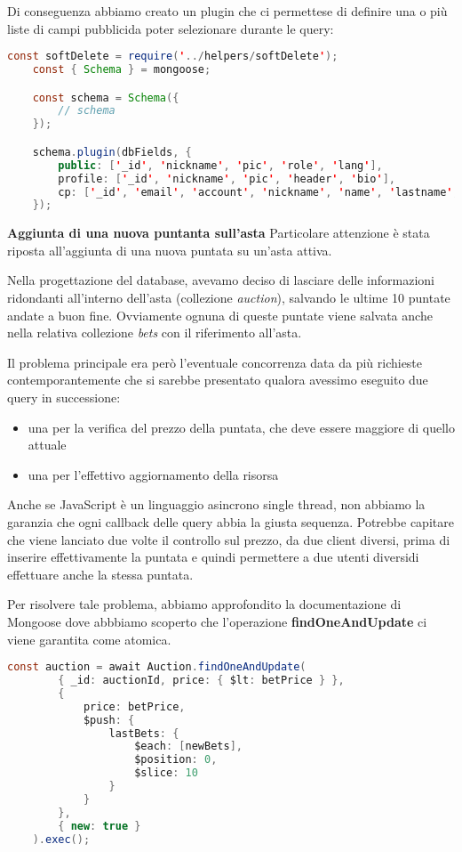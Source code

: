 Di conseguenza abbiamo creato un plugin che ci permettese di definire una o più liste di campi pubblicida poter selezionare durante le query:

\begin{lstlisting}[language=java]
	const softDelete = require('../helpers/softDelete');
	const { Schema } = mongoose;

	const schema = Schema({
		// schema
	});

	schema.plugin(dbFields, {
		public: ['_id', 'nickname', 'pic', 'role', 'lang'],
		profile: ['_id', 'nickname', 'pic', 'header', 'bio'],
		cp: ['_id', 'email', 'account', 'nickname', 'name', 'lastname', 'pic', 'lang', 'role', 'active']
	});
\end{lstlisting}

\bigbreak
\noindent
\textbf{Aggiunta di una nuova puntanta sull'asta}
\bigbreak
\noindent
Particolare attenzione è stata riposta all'aggiunta di una nuova puntata su un'asta attiva.

Nella progettazione del database, avevamo deciso di lasciare delle informazioni ridondanti all'interno dell'asta (collezione \textit{auction}),
salvando le ultime 10 puntate andate a buon fine. 
Ovviamente ognuna di queste puntate viene salvata anche nella relativa collezione \textit{bets} con il riferimento all'asta.

Il problema principale era però l'eventuale concorrenza data da più richieste contemporantemente
che si sarebbe presentato qualora avessimo eseguito due query in successione:
\begin{itemize}
	\item una per la verifica del prezzo della puntata, che deve essere maggiore di quello attuale
	\item una per l'effettivo aggiornamento della risorsa
\end{itemize}

Anche se JavaScript è un linguaggio asincrono single thread, non abbiamo la garanzia che ogni callback delle query abbia la giusta sequenza.
Potrebbe capitare che viene lanciato due volte il controllo sul prezzo, da due client diversi, 
prima di inserire effettivamente la puntata e quindi permettere a due utenti diversidi effettuare anche la stessa puntata.

Per risolvere tale problema, abbiamo approfondito la documentazione di Mongoose 
dove abbbiamo scoperto che l'operazione \textbf{findOneAndUpdate} ci viene garantita come atomica.

\begin{lstlisting}[language=java]
	const auction = await Auction.findOneAndUpdate(
		{ _id: auctionId, price: { $lt: betPrice } },
		{
			price: betPrice,
			$push: {
				lastBets: {
					$each: [newBets],
					$position: 0,
					$slice: 10
				}
			}
		},
		{ new: true }
	).exec();
\end{lstlisting}

